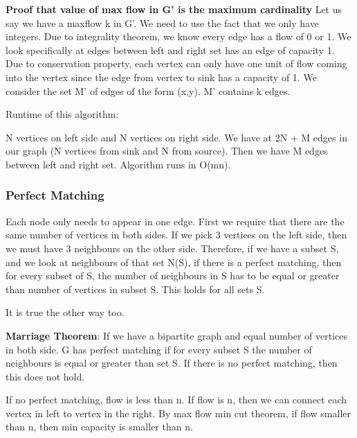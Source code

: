 \documentclass[11pt, oneside]{article}
\theoremstyle{definition}
\begin{document}
\textbf{Proof that value of max flow in G' is the maximum cardinality} Let us say we have a maxflow k in G'. We need to use the fact that we only have integers. Due to integrality theorem, we know every edge has a flow of 0 or 1. We look specifically at edges between left and right set has an edge of capacity 1. Due to conservation property, each vertex can only have one unit of flow coming into the vertex since the edge from vertex to sink has a capacity of 1. We consider the set M' of edges of the form (x,y). M' contains k edges.

Runtime of this algorithm:

N vertices on left side and N vertices on right side. We have at 2N + M edges in our graph (N vertices from sink and N from source). Then we have M edges between left and right set. Algorithm runs in O(mn).

\subsubsection{Perfect Matching}
Each node only needs to appear in one edge. First we require that there are the same number of vertices in both sides. If we pick 3 vertices on the left side, then we must have 3 neighbours on the other side. Therefore, if we have a subset S, and we look at neighbours of that set N(S), if there is a perfect matching, then for every subset of S, the number of neighbours in S has to be equal or greater than number of vertices in subset S. This holds for all sets S.

It is true the other way too.

\textbf{Marriage Theorem}: If we have a bipartite graph and equal number of vertices in both side. G has perfect matching if for every subset S the number of neighbours is equal or greater than set S. If there is no perfect matching, then this does not hold.


If no perfect matching, flow is less than n. If flow is n, then we can connect each vertex in left to vertex in the right. By max flow min cut theorem, if flow smaller than n, then min capacity  is smaller than n.
\end{document}
